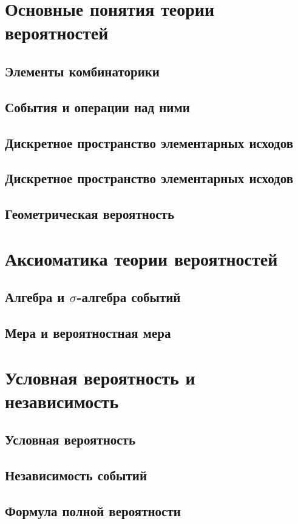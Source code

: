 \section{Основные понятия теории вероятностей}

\subsection{Элементы комбинаторики}


\subsection{События и операции над ними}


\subsection{Дискретное пространство элементарных исходов}


\subsection{Дискретное пространство элементарных исходов}


\subsection{Геометрическая вероятность}





\section{Аксиоматика теории вероятностей}

\subsection{Алгебра и \texorpdfstring{$\sigma$}{сигма}-алгебра событий}


\subsection{Мера и вероятностная мера}





\section{Условная вероятность и независимость}

\subsection{Условная вероятность}


\subsection{Независимость событий}


\subsection{Формула полной вероятности}




